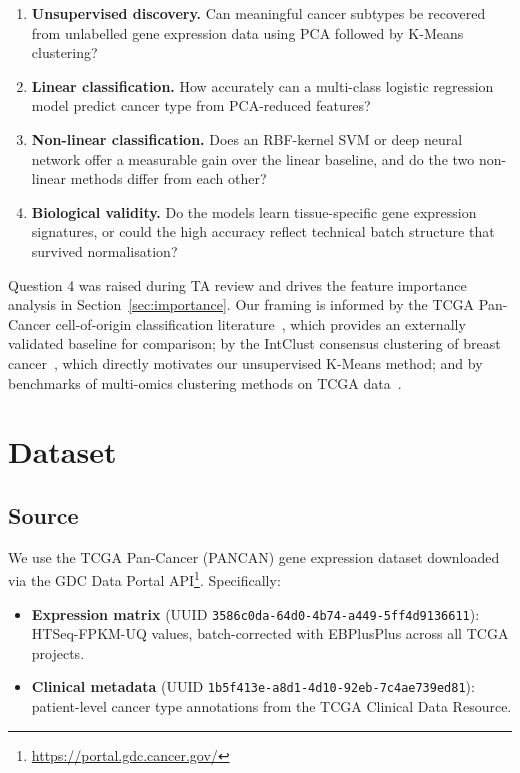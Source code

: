 \documentclass[11pt,letterpaper]{article}
\begin{document}
\begin{enumerate}[leftmargin=2em,itemsep=1pt]
  \item \textbf{Unsupervised discovery.}  Can meaningful cancer subtypes be
        recovered from unlabelled gene expression data using PCA followed by
        K-Means clustering?
  \item \textbf{Linear classification.}  How accurately can a multi-class
        logistic regression model predict cancer type from PCA-reduced features?
  \item \textbf{Non-linear classification.}  Does an RBF-kernel SVM or deep
        neural network offer a measurable gain over the linear baseline, and do
        the two non-linear methods differ from each other?
  \item \textbf{Biological validity.}  Do the models learn tissue-specific gene
        expression signatures, or could the high accuracy reflect technical
        batch structure that survived normalisation?
\end{enumerate}

Question 4 was raised during TA review and drives the feature importance
analysis in Section~\ref{sec:importance}.  Our framing is informed by the TCGA
Pan-Cancer cell-of-origin classification literature~\cite{hoadley2018}, which
provides an externally validated baseline for comparison; by the IntClust
consensus clustering of breast cancer~\cite{curtis2012}, which directly
motivates our unsupervised K-Means method; and by benchmarks of multi-omics
clustering methods on TCGA data~\cite{rappoport2018}.

\section{Dataset}
\label{sec:dataset}

\subsection{Source}

We use the TCGA Pan-Cancer (PANCAN) gene expression dataset downloaded via the
GDC Data Portal API\footnote{\url{https://portal.gdc.cancer.gov/}}.
Specifically:

\begin{itemize}[leftmargin=2em,itemsep=1pt]
  \item \textbf{Expression matrix} (UUID
        \texttt{3586c0da-64d0-4b74-a449-5ff4d9136611}):
        HTSeq-FPKM-UQ values, batch-corrected with EBPlusPlus across all TCGA
        projects.
  \item \textbf{Clinical metadata} (UUID
        \texttt{1b5f413e-a8d1-4d10-92eb-7c4ae739ed81}):
        patient-level cancer type annotations from the TCGA Clinical Data
        Resource.
\end{itemize}
\end{document}
